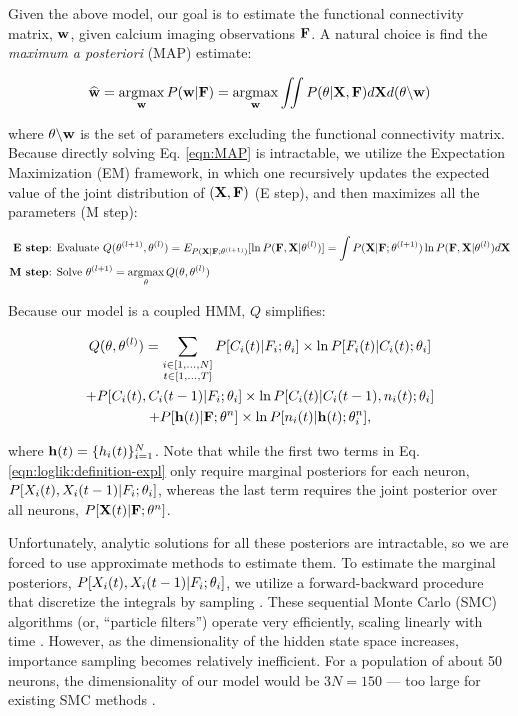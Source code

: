 Given the above model, our goal is to estimate the functional connectivity matrix, $\mathbf{w}$, given calcium imaging observations ${\bf F}$. A natural choice is find the \emph{maximum a posteriori} (MAP) estimate:

\begin{equation}\label{eqn:MAP}
\widehat{\mathbf{w}}=\operatorname*{argmax}_{\mathbf{w}} P(\mathbf{w}| {\bf F}) = \operatorname*{argmax}_{\mathbf{w}} \iint P(\mathbf{\theta}| {\bf X}, {\bf F}) d{\bf X} d(\mathbf{\theta} \backslash \mathbf{w})
\end{equation}

\noindent where $\mathbf{\theta} \backslash \mathbf{w}$ is the set of parameters excluding the functional connectivity matrix.  Because directly solving Eq. \eqref{eqn:MAP} is intractable, we utilize the Expectation Maximization (EM) framework, in which one recursively updates the expected value of the joint distribution of $({\bf X}, {\bf F})$ (E step), and then maximizes all the parameters (M step):

\begin{align*}
\textbf{E step} &\text{: Evaluate } Q(\mathbf{\theta}^{(l+1)},\mathbf{\theta}^{(l)}) = E_{P({\bf X} | {\bf F}; \mathbf{\theta}^{(l+1)})}[ \ln P({\bf F}, {\bf X} | \mathbf{\theta}^{(l)})] = \int P({\bf X} | {\bf F}; \mathbf{\theta}^{(l+1)}) \ln P({\bf F}, {\bf X} | \mathbf{\theta}^{(l)}) d {\bf X}  \\
\textbf{M step} &\text{: Solve } \mathbf{\theta}^{(l+1)} = \operatorname*{argmax}_{\mathbf{\theta}} Q(\mathbf{\theta},\mathbf{\theta}^{(l)})  
\end{align*}

Because our model is a coupled HMM, $Q$ simplifies:

\begin{multline}\label{eqn:loglik:definition-expl}
Q(\mathbf{\theta},\mathbf{\theta}^{(l)}) = 
\sum_{\substack{i \in [1,\ldots,N] \\ t \in [1,\ldots, T]}} 
P[C_i(t) | F_i; \mathbf{\theta}_i] \times \ln P[F_i(t)|C_i(t); \mathbf{\theta}_i] 
\\ + P[C_i(t), C_i(t-1) | F_i; \mathbf{\theta}_i] \times \ln P[C_i(t)|C_i(t-1), n_i(t); \mathbf{\theta}_i] 
\\ + P[\mathbf{h}(t) | {\bf F}; \mathbf{\theta}^n] \times \ln P[n_i(t)| \mathbf{h}(t); \mathbf{\theta}^n_i],
\end{multline}

\noindent where $\mathbf{h}(t)=\{h_i(t)\}_{i=1}^N$.  Note that while the first two terms in Eq. \eqref{eqn:loglik:definition-expl} only require marginal posteriors for each neuron, $P[X_i(t), X_i(t-1) | F_i; \mathbf{\theta}_i]$, whereas the last term requires the joint posterior over all neurons, $P[{\bf X}(t) | {\bf F}; \mathbf{\theta}^n]$.  

Unfortunately, analytic solutions for all these posteriors are intractable, so we are forced to use approximate methods to estimate them.  To estimate the marginal posteriors, $P[X_i(t), X_i(t-1) | F_i; \mathbf{\theta}_i]$, we utilize a forward-backward procedure that discretize the integrals by sampling \cite{DFG01, MINKAPHD, Fearnhead2003, koyama08, Andrieu2007, NBR03}.  These sequential Monte Carlo (SMC) algorithms (or, ``particle filters'') operate very efficiently, scaling linearly with time \cite{RAB89}. However, as the dimensionality of the hidden state space increases, importance sampling becomes relatively inefficient.  For a population of about 50 neurons, the dimensionality of our model would be $3N=150$ --- too large for existing SMC methods \cite{??}.  

